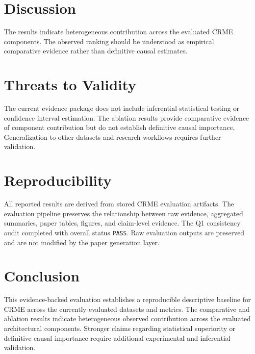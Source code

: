\documentclass[11pt]{article}
\begin{document}
\section{Discussion}
The results indicate heterogeneous contribution across the evaluated CRME components.
The observed ranking should be understood as empirical comparative evidence rather than definitive causal estimates.

\section{Threats to Validity}
The current evidence package does not include inferential statistical testing or confidence interval estimation.
The ablation results provide comparative evidence of component contribution but do not establish definitive causal importance.
Generalization to other datasets and research workflows requires further validation.

\section{Reproducibility}
All reported results are derived from stored CRME evaluation artifacts.
The evaluation pipeline preserves the relationship between raw evidence, aggregated summaries, paper tables, figures, and claim-level evidence.
The Q1 consistency audit completed with overall status \texttt{PASS}.
Raw evaluation outputs are preserved and are not modified by the paper generation layer.

\section{Conclusion}
This evidence-backed evaluation establishes a reproducible descriptive baseline for CRME across the currently evaluated datasets and metrics.
The comparative and ablation results indicate heterogeneous observed contribution across the evaluated architectural components.
Stronger claims regarding statistical superiority or definitive causal importance require additional experimental and inferential validation.
\end{document}
